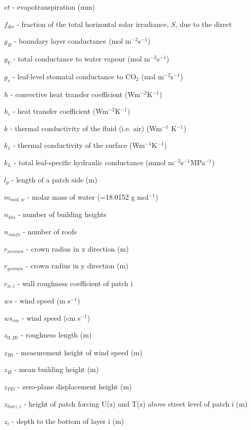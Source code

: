 {\begin{description}
\item $et$  -  evapotranspiration (mm) 
\item $f_{dir}$  -  fraction of the total horizontal solar irradiance, $S$, due to the direct 
\item $g_{B}$  -  boundary layer conductance (mol m$^{-2}$s$^{-1}$) 
\item $g_{V}$   -  total conductance to water vapour (mol m$^{-2}$s$^{-1}$) 
\item $g_{s}$  -  leaf-level stomatal conductance to CO$_{2}$ (mol m$^{-2}$s$^{-1}$) 
\item $h$  -  convective heat transfer coefficient (Wm$^{-2}$K$^{-1}$) 
\item $h_{i}$  -   heat transfer coefficient (Wm$^{-2}$K$^{-1}$) 
\item $k$  -  thermal conductivity of the fluid (i.e. air) (Wm$^{-1}$ K$^{-1}$) 
\item $k_{1}$  -  thermal conductivity of the surface (Wm$^{-1}$K$^{-1}$) 
\item $k_{L}$  -  total leaf-specific hydraulic conductance (mmol m$^{-2}$s$^{-1}$MPa$^{-1}$) 
\item $l_{p}$  -  length of a patch side (m) 
\item $m_{mol,w}$  -  molar mass of water (=18.0152 g mol$^{-1}$) 
\item $n _{hts}$  -  number of building heights 
\item $n _{roofs}$  -  number of roofs 
\item $r _{xcrown}$  -  crown radius in x direction (m) 
\item $r _{ycrown}$  -  crown radius in y direction (m) 
\item $r_{w,i}$  -  wall roughness coefficient of patch i 
\item $ws$  -  wind speed (m s$^{-1}$) 
\item $ws_{cm}$  -  wind speed (cm s$^{-1}$) 
\item $z_{0,Ht}$  -  roughness length (m) 
\item $z_{Ht}$  -  measurement height of wind speed (m) 
\item $z_{H}$  -  mean building height (m) 
\item $z_{PD}$  -   zero-plane displacement height (m) 
\item $z_{horz,i}$  -  height of patch forcing U(z) and T(z) above street level of patch i (m) 
\item $z_{i}$  -  depth to the bottom of layer i (m) 


\end{description}
}
